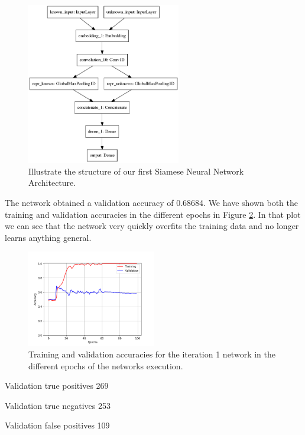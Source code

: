 \begin{figure}[htb]
    \centering
    \includegraphics[width=0.6\textwidth]{./pictures/method/network1.png}
    \caption{Illustrate the structure of our first Siamese Neural Network
        Architecture.}
    \label{fig:network_1}
\end{figure}

The network obtained a validation accuracy of 0.68684. We have shown both the
training and validation accuracies in the different epochs in Figure
\ref{fig:network1_accuracies}. In that plot we can see that the network very
quickly overfits the training data and no longer learns anything general.

\begin{figure}[htb]
    \centering
    \includegraphics[width=0.5\textwidth]{./pictures/method/network_1_accuracies.png}
    \caption{Training and validation accuracies for the iteration 1 network in
        the different epochs of the networks execution.}
    \label{fig:network1_accuracies}
\end{figure}

Validation true positives 269

Validation true negatives 253

Validation false positives 109

